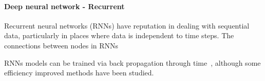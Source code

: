 \paragraph{Deep neural network - Recurrent}
Recurrent neural networks (RNNs) have reputation in dealing with sequential data, particularly in places where data is independent to time steps. The connections between nodes in RNNs 


RNNs models can be trained via back propagation through time~\cite{Goodfellow-et-al-2016}, although some efficiency improved methods have been studied.~\cite{963769,neco.1989,Gomez:2008:ANE:1390681.1390712}